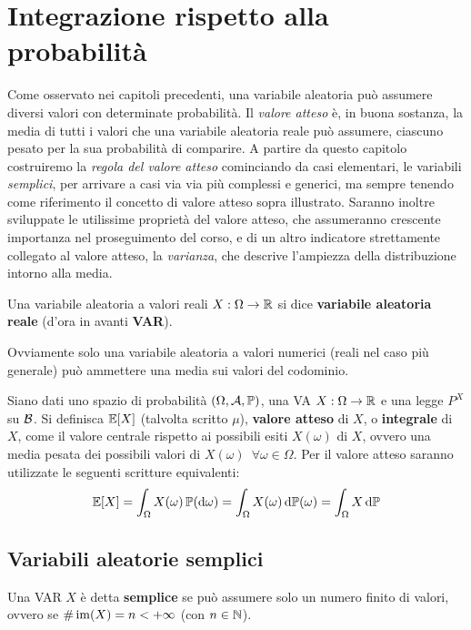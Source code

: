 \section{Integrazione rispetto alla probabilità}
Come osservato nei capitoli precedenti, una variabile aleatoria può assumere diversi valori con determinate probabilità.
Il \emph{valore atteso} è, in buona sostanza, la media di tutti i valori che una variabile aleatoria reale può assumere, ciascuno pesato per la sua probabilità di comparire.
A partire da questo capitolo costruiremo la \emph{regola del valore atteso} cominciando da casi elementari, le variabili \emph{semplici}, per arrivare a casi via via più complessi e generici, ma sempre tenendo come riferimento il concetto di valore atteso sopra illustrato.
Saranno inoltre sviluppate le utilissime proprietà del valore atteso, che assumeranno crescente importanza nel proseguimento del corso, e di un altro indicatore strettamente collegato al valore atteso, la \emph{varianza}, che descrive l'ampiezza della distribuzione intorno alla media.
\smallskip

\begin{defn}
	Una variabile aleatoria a valori reali $X:\Omega \to \mathbb R$ si dice \textbf{variabile aleatoria reale} (d'ora in avanti \textbf{VAR}).
\end{defn}
Ovviamente solo una variabile aleatoria a valori numerici (reali nel caso più generale) può ammettere una media sui valori del codominio.
\smallskip

\begin{defn}
	Siano dati uno spazio di probabilità $(\Omega, \mathcal A, \mathbb P)$, una VA $X:\Omega \to \mathbb R$ e una legge $P^X$ su $\mathcal B$.
	Si definisca $\mathbb E[X]$ (talvolta scritto $\mu$), \textbf{valore atteso} di $X$, o \textbf{integrale} di $X$, come il valore centrale rispetto ai possibili esiti $X(\omega)$ di $X$, ovvero una media pesata dei possibili valori di $X(\omega) \enspace \forall \omega \in \Omega$.
	Per il valore atteso saranno utilizzate le seguenti scritture equivalenti:
	$$
  		\mathbb E[X] = \int_\Omega X(\omega) \, \mathbb P(\mathrm d \omega) = \int_\Omega X(\omega) \, \mathrm d \mathbb P(\omega) = \int_\Omega X \, \mathrm d \mathbb P
	$$
\end{defn}

\subsection{Variabili aleatorie semplici}
\begin{defn}
  Una VAR $X$ è detta \textbf{semplice} se può assumere solo un numero finito di valori, ovvero se  $\#\operatorname{im}(X) = n < +\infty$ (con $n \in \mathbb N$).
\end{defn}


